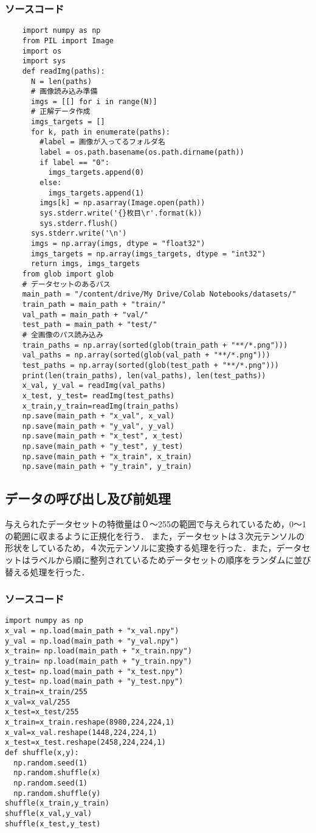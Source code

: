 \documentclass{article}
\begin{document}
\subsubsection{ソースコード}
\begin{lstlisting}
    import numpy as np
    from PIL import Image
    import os
    import sys
    def readImg(paths):
      N = len(paths)
      # 画像読み込み準備
      imgs = [[] for i in range(N)]
      # 正解データ作成
      imgs_targets = []
      for k, path in enumerate(paths):
        #label = 画像が入ってるフォルダ名
        label = os.path.basename(os.path.dirname(path))
        if label == "0":
          imgs_targets.append(0)
        else:
          imgs_targets.append(1)
        imgs[k] = np.asarray(Image.open(path))
        sys.stderr.write('{}枚目\r'.format(k))
        sys.stderr.flush()
      sys.stderr.write('\n')
      imgs = np.array(imgs, dtype = "float32")
      imgs_targets = np.array(imgs_targets, dtype = "int32")
      return imgs, imgs_targets
    from glob import glob
    # データセットのあるパス
    main_path = "/content/drive/My Drive/Colab Notebooks/datasets/"
    train_path = main_path + "train/"
    val_path = main_path + "val/"
    test_path = main_path + "test/"
    # 全画像のパス読み込み
    train_paths = np.array(sorted(glob(train_path + "**/*.png")))
    val_paths = np.array(sorted(glob(val_path + "**/*.png")))
    test_paths = np.array(sorted(glob(test_path + "**/*.png")))
    print(len(train_paths), len(val_paths), len(test_paths))
    x_val, y_val = readImg(val_paths)
    x_test, y_test= readImg(test_paths)
    x_train,y_train=readImg(train_paths)
    np.save(main_path + "x_val", x_val)
    np.save(main_path + "y_val", y_val)
    np.save(main_path + "x_test", x_test)
    np.save(main_path + "y_test", y_test)
    np.save(main_path + "x_train", x_train)
    np.save(main_path + "y_train", y_train)
\end{lstlisting}
\subsection{データの呼び出し及び前処理}
与えられたデータセットの特徴量は０〜255の範囲で与えられているため，0〜1の範囲に収まるように正規化を行う．
また，データセットは３次元テンソルの形状をしているため，４次元テンソルに変換する処理を行った．また，データセットはラベルから順に整列されているためデータセットの順序をランダムに並び替える処理を行った．
\subsubsection{ソースコード}
\begin{lstlisting}
import numpy as np
x_val = np.load(main_path + "x_val.npy")
y_val = np.load(main_path + "y_val.npy")
x_train= np.load(main_path + "x_train.npy")
y_train= np.load(main_path + "y_train.npy")
x_test= np.load(main_path + "x_test.npy")
y_test= np.load(main_path + "y_test.npy")
x_train=x_train/255
x_val=x_val/255
x_test=x_test/255
x_train=x_train.reshape(8980,224,224,1)
x_val=x_val.reshape(1448,224,224,1)
x_test=x_test.reshape(2458,224,224,1)
def shuffle(x,y):
  np.random.seed(1)
  np.random.shuffle(x)
  np.random.seed(1)
  np.random.shuffle(y)
shuffle(x_train,y_train)
shuffle(x_val,y_val)
shuffle(x_test,y_test)
\end{lstlisting}
\end{document}
